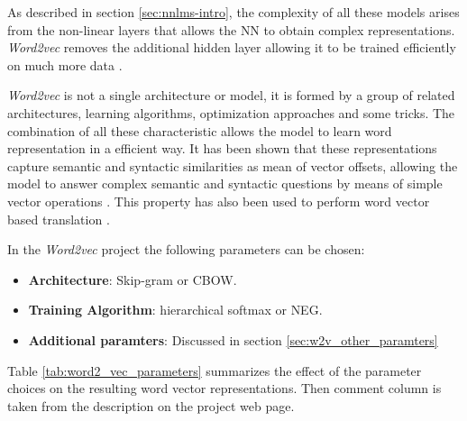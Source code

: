 As  described in section \ref{sec:nnlms-intro}, the complexity of all 
these models arises from the non-linear layers  that allows the \ac{NN} to
obtain complex representations.  \textit{Word2vec} removes the additional
hidden layer  allowing it to be trained efficiently on much more data  \cite{DBLP:journals/corr/abs-1301-3781}.

\textit{Word2vec} is not a single architecture or model, it is formed by a
group of related architectures, learning algorithms, optimization 
approaches and some tricks. The combination of all these characteristic
allows the model  to learn word representation in a efficient
way. It has been shown that these representations  capture semantic and
syntactic 
similarities as mean of vector offsets, allowing the model to answer complex
semantic and syntactic questions by means 
of simple vector operations   \cite{MikolovSCCD13}. This property  has also
been used to perform word vector based translation \cite{DBLP:journals/corr/MikolovLS13}.  

In the \textit{Word2vec} project the following parameters can be chosen:


\begin{itemize}
\item \textbf{Architecture}: Skip-gram or \ac{CBOW}.
\item \textbf{Training Algorithm}: hierarchical softmax  or \ac{NEG}.
\item \textbf{Additional paramters}: Discussed in section \ref{sec:w2v_other_paramters}
\end{itemize}


Table \ref{tab:word2_vec_parameters} summarizes the effect of the parameter choices on the resulting word vector representations.  Then comment column is
taken from the description  on the project web page.


